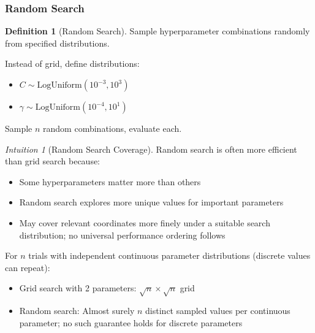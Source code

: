 \documentclass[11pt,twoside]{article}
\numberwithin{equation}{section}
\theoremstyle{plain}
\theoremstyle{definition}
\newtheorem{definition}[theorem]{Definition}
\theoremstyle{remark}
\newtheorem{intuition}[theorem]{Intuition}
\begin{document}
\subsubsection{Random Search}

\begin{definition}[Random Search]
Sample hyperparameter combinations randomly from specified distributions.

Instead of grid, define distributions:
\begin{itemize}
\item $C \sim \text{LogUniform}(10^{-3}, 10^3)$
\item $\gamma \sim \text{LogUniform}(10^{-4}, 10^1)$
\end{itemize}

Sample $n$ random combinations, evaluate each.
\end{definition}

\begin{intuition}[Random Search Coverage]
Random search is often more efficient than grid search because:
\begin{itemize}
\item Some hyperparameters matter more than others
\item Random search explores more unique values for important parameters
\item May cover relevant coordinates more finely under a suitable search distribution; no universal performance ordering follows
\end{itemize}

For $n$ trials with independent continuous parameter distributions (discrete values can repeat):
\begin{itemize}
\item Grid search with 2 parameters: $\sqrt{n} \times \sqrt{n}$ grid
\item Random search: Almost surely $n$ distinct sampled values per continuous parameter; no such guarantee holds for discrete parameters
\end{itemize}
\end{intuition}
\end{document}
